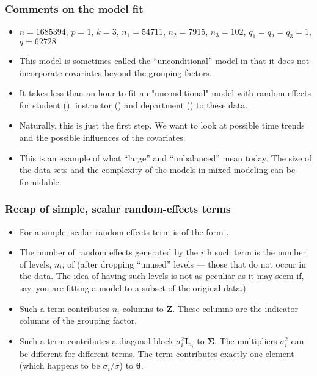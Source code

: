 \begin{frame}
  \frametitle{Comments on the model fit}
  \begin{itemize}
  \item $n=1685394$, $p=1$, $k=3$, $n_1=54711$, $n_2=7915$, $n_3=102$,
    $q_1=q_2=q_3=1$, $q=62728$
  \item This model is sometimes called the ``unconditional'' model in
    that it does not incorporate covariates beyond the grouping factors.
  \item It takes less than an hour to fit an "unconditional" model
    with random effects for student (), instructor
    () and department () to these data.
  \item Naturally, this is just the first step.  We want to look at
    possible time trends and the possible influences of the
    covariates.
  \item This is an example of what ``large'' and ``unbalanced'' mean
    today.  The size of the data sets and the complexity of the models
    in mixed modeling can be formidable.
  \end{itemize}
\end{frame}

\begin{frame}
  \frametitle{Recap of simple, scalar random-effects terms}
  \begin{itemize}
  \item For  a simple, scalar random effects term is of the
    form .
  \item The number of random effects generated by the $i$th such
    term is the number of levels, $n_i$, of  (after dropping
    ``unused'' levels --- those that do not occur in the data.  The idea
    of having such levels is not as peculiar as it may seem if, say,
    you are fitting a model to a subset of the original data.)
  \item Such a term contributes $n_i$ columns to $\bm Z$.  These
    columns are the indicator columns of the grouping factor.
  \item Such a term contributes a diagonal block $\sigma^2_i\bm
    I_{n_i}$ to $\bm\Sigma$.  The multipliers $\sigma_i^2$ can be
    different for different terms. The term contributes exactly one
    element (which happens to be $\sigma_i/\sigma$) to $\bm\theta$.
  \end{itemize}
\end{frame}

